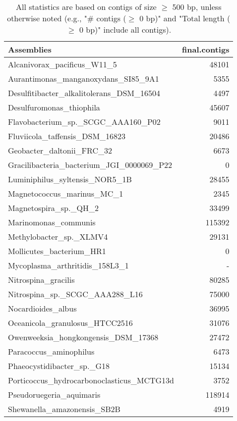 \documentclass[12pt,a4paper]{article}
\begin{document}
\begin{table}[ht]
\begin{center}
\caption{All statistics are based on contigs of size $\geq$ 500 bp, unless otherwise noted (e.g., "\# contigs ($\geq$ 0 bp)" and "Total length ($\geq$ 0 bp)" include all contigs).}
\begin{tabular}{|l*{1}{|r}|}
\hline
Assemblies & final.contigs \\ \hline
Alcanivorax\_pacificus\_W11\_5 & 48101 \\ \hline
Aurantimonas\_manganoxydans\_SI85\_9A1 & 5355 \\ \hline
Desulfitibacter\_alkalitolerans\_DSM\_16504 & 4497 \\ \hline
Desulfuromonas\_thiophila & 45607 \\ \hline
Flavobacterium\_sp.\_SCGC\_AAA160\_P02 & 9011 \\ \hline
Fluviicola\_taffensis\_DSM\_16823 & 20486 \\ \hline
Geobacter\_daltonii\_FRC\_32 & 6673 \\ \hline
Gracilibacteria\_bacterium\_JGI\_0000069\_P22 & 0 \\ \hline
Luminiphilus\_syltensis\_NOR5\_1B & 28455 \\ \hline
Magnetococcus\_marinus\_MC\_1 & 2345 \\ \hline
Magnetospira\_sp.\_QH\_2 & 33499 \\ \hline
Marinomonas\_communis & 115392 \\ \hline
Methylobacter\_sp.\_XLMV4 & 29131 \\ \hline
Mollicutes\_bacterium\_HR1 & 0 \\ \hline
Mycoplasma\_arthritidis\_158L3\_1 & - \\ \hline
Nitrospina\_gracilis & 80285 \\ \hline
Nitrospina\_sp.\_SCGC\_AAA288\_L16 & 75000 \\ \hline
Nocardioides\_albus & 36995 \\ \hline
Oceanicola\_granulosus\_HTCC2516 & 31076 \\ \hline
Owenweeksia\_hongkongensis\_DSM\_17368 & 27472 \\ \hline
Paracoccus\_aminophilus & 6473 \\ \hline
Phaeocystidibacter\_sp.\_G18 & 15134 \\ \hline
Porticoccus\_hydrocarbonoclasticus\_MCTG13d & 3752 \\ \hline
Pseudoruegeria\_aquimaris & 118914 \\ \hline
Shewanella\_amazonensis\_SB2B & 4919 \\ \hline

\end{tabular}
\end{center}
\end{table}
\end{document}

